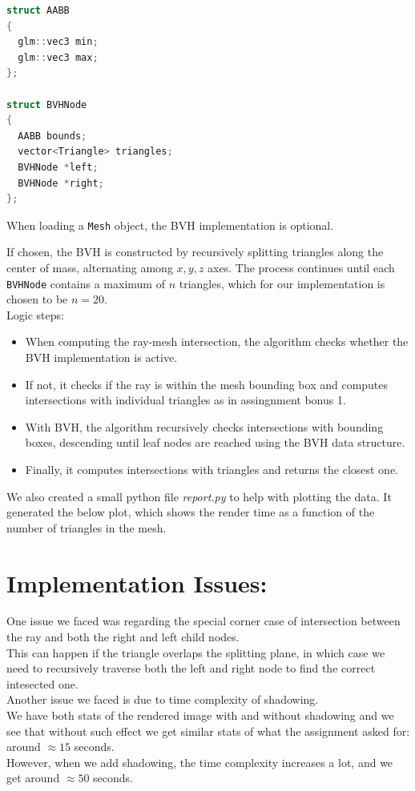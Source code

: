 \documentclass{article}
\begin{document}
\begin{lstlisting}[language=C++]
struct AABB
{
  glm::vec3 min;
  glm::vec3 max;
};

struct BVHNode
{
  AABB bounds;
  vector<Triangle> triangles;
  BVHNode *left;
  BVHNode *right;
};
\end{lstlisting}

When loading a \texttt{Mesh} object, the BVH implementation is optional.

If chosen, the BVH is constructed by recursively splitting triangles along the center of mass,
alternating among $x, y, z$ axes.
The process continues until each \texttt{BVHNode} contains a maximum of $n$ triangles, which for our implementation
is chosen to be $n=20$.\\

Logic steps:
\begin{itemize}
  \item When computing the ray-mesh intersection, the algorithm checks whether the BVH implementation is active.
  \item If not, it checks if the ray is within the mesh bounding box and computes intersections with individual triangles as in assingnment bonus 1.
  \item With BVH, the algorithm recursively checks intersections with bounding boxes, descending until leaf nodes are reached using the BVH data structure.
  \item Finally, it computes intersections with triangles and returns the closest one.
\end{itemize}

We also created a small python file \textit{report.py} to help with plotting the data.
It generated the below plot, which shows the render time as a function of the number of triangles in the mesh.

\section*{Implementation Issues:}

One issue we faced was regarding the special corner case of intersection between the ray
and both the right and left child nodes.\\
This can happen if the triangle overlaps the splitting plane, in which case we need to recursively
traverse both the left and right node to find the correct intesected one.\\

Another issue we faced is due to time complexity of shadowing.\\
We have both stats of the rendered image with and without shadowing and we see that without such effect
we get similar stats of what the assignment asked for: around $\approx 15$ seconds.\\
However, when we add shadowing, the time complexity increases a lot, and we get around $\approx 50$ seconds.\\
\end{document}
